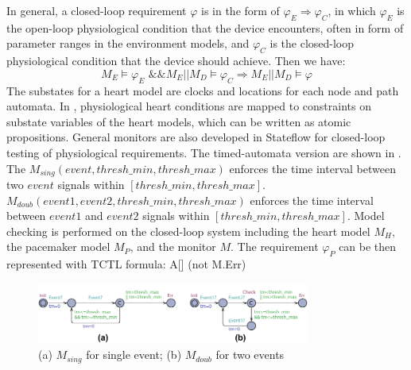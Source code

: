 In general, a closed-loop requirement $\varphi$ is in the form of $\varphi_E\Rightarrow \varphi_C$, in which $\varphi_E$ is the open-loop physiological condition that the device encounters, often in form of parameter ranges in the environment models, and $\varphi_C$ is the closed-loop physiological condition that the device should achieve. Then we have:
\begin{equation}\label{req_def}
M_E\models\varphi_E \text{ \&\& }M_E||M_D\models \varphi_C\Rightarrow M_E||M_D\models\varphi
\end{equation}
The substates for a heart model are clocks and locations for each node and path automata. In \cite{vhm_iccps11}, physiological heart conditions are mapped to constraints on substate variables of the heart models, which can be written as atomic propositions. General monitors are also developed in Stateflow \cite{stateflow} for closed-loop testing of physiological requirements. The timed-automata version are shown in . The $M_{sing}(event,thresh\_min, thresh\_max)$ enforces the time interval between two $event$ signals within $[thresh\_min,thresh\_max]$. \\
$M_{doub}(event1,event2,thresh\_min,thresh\_max)$ enforces the time interval between $event1$ and $event2$ signals within $[thresh\_min,thresh\_max]$. Model checking is performed on the closed-loop system including the heart model $M_H$, the pacemaker model $M_P$, and the monitor $M$. The requirement $\varphi_P$ can be then represented with TCTL formula:
 \textsf{A[] (not M.Err)}
\begin{figure}[!t]
		\centering
		\includegraphics[width=0.8\textwidth]{figs/monitor.pdf}
		\caption{\small (a) $M_{sing}$ for single event; (b) $M_{doub}$ for two events}
		\label{fig:monitor}
\end{figure}
%